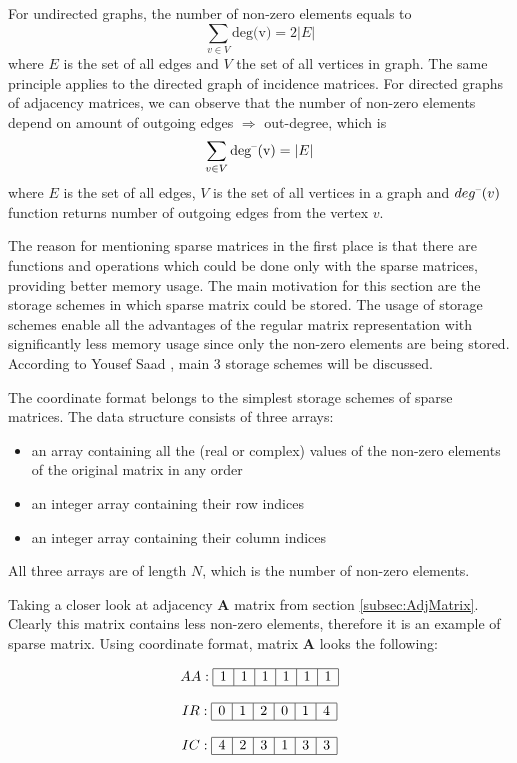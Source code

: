 \documentclass[thesis=M,english]{FITthesis}[2012/10/20]
\begin{document}
For undirected graphs, the number of non-zero elements equals to $$ \sum_{v \in V} \textrm{deg(v)} = 2|E| $$ where $E$ is the set of all edges and $V$ the set of all vertices in graph. The same principle applies to the directed graph of incidence matrices. For directed graphs of adjacency matrices, we can observe that the number of non-zero elements depend on amount of outgoing edges $\Rightarrow$ out-degree, which is 
$$ \sum_{v \in V} \textrm{deg\textsuperscript{--}(v)} = |E| $$ where $E$ is the set of all edges, $V$ is the set of all vertices in a graph and $deg\textsuperscript{--}(v)$ function returns number of outgoing edges from the vertex $v$.

The reason for mentioning sparse matrices in the first place is that there are functions and operations which could be done only with the sparse matrices, providing better memory usage. The main motivation for this section are the storage schemes in which sparse matrix could be stored. The usage of storage schemes enable all the advantages of the regular matrix representation with significantly less memory usage since only the non-zero elements are being stored. According to Yousef Saad \cite{Saad03}, main 3 storage schemes will be discussed. 

The coordinate format belongs to the simplest storage schemes of sparse matrices. The data structure consists of three arrays: 
\begin{itemize}
\item an array containing all the (real or complex) values of the non-zero elements of the original matrix in any order
\item an integer array containing their row indices 
\item an integer array containing their column indices
\end{itemize}
All three arrays are of length $N$, which is the number of non-zero elements.

Taking a closer look at adjacency $\textbf{A}$ matrix from section \ref{subsec:AdjMatrix}. Clearly this matrix contains less non-zero elements, therefore it is an example of sparse matrix. Using coordinate format, matrix $\textbf{A}$ looks the following:

$$
\begin{array}{c}

AA:
\begin{array}{|c|c|c|c|c|c|}
 \hline
 1 & 1 & 1 & 1 & 1 & 1 \\
 \hline
\end{array}
\\ \\
IR:
\begin{array}{|c|c|c|c|c|c|}
 \hline
 0 & 1 & 2 & 0 & 1 & 4 \\
 \hline
\end{array}
\\ \\
IC:
\begin{array}{|c|c|c|c|c|c|}
 \hline
 4 & 2 & 3 & 1 & 3 & 3 \\
 \hline
\end{array}
\end{array}
$$
\end{document}
